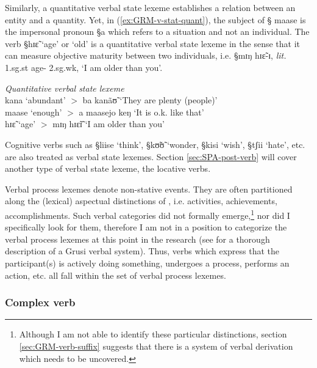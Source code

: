 Similarly, a quantitative verbal state lexeme  establishes a relation between an
entity and a quantity. Yet, in (\ref{ex:GRM-v-stat-quant}), the subject of   {\S
maase} is the impersonal pronoun {\S a} which refers to a situation and not an
individual. The verb {\S hɪɛ̃}  `age' or `old'  is a quantitative verbal state
lexeme in the sense that it can measure objective maturity between
two individuals, i.e. {\S mɪŋ hɪɛ̃-ɪ}, {\it lit.} {\sc 1.sg.st} age-{\sc
2.sg.wk}, `I am older than you'. 


\begin{exe}
\ex\label{ex:GRM-v-stat-quant}{\it Quantitative verbal state lexeme}\\
 {\I kana}  `abundant'  $>$ {\I ba kanãʊ̃} `They are plenty (people)' \\
{\I maase} `enough'  $>$   {\I a maasejo keŋ} `It is o.k. like that'\\
{\I hɪɛ̃} `age' $>$ {\I mɪŋ hɪɛ̃ɪ̃} `I am older than you'
\end{exe}

Cognitive verbs such as {\S liise} `think',  {\S kʊ̃ʊ̃} `wonder, 
{\S kisi} `wish',    {\S tʃii} `hate', etc.  are also treated as verbal state
lexemes. Section \ref{sec:SPA-post-verb} will  cover another
type  of verbal state lexeme,  the locative verbs. 

Verbal process lexemes denote non-stative events. They are often partitioned
along the
(lexical) aspectual distinctions of  \cite{Vend57}, i.e. activities, 
achievements, accomplishments. Such verbal categories did not formally
emerge,\footnote{Although I am not able to identify these particular
distinctions, section \ref{sec:GRM-verb-suffix} suggests that there is a system
of verbal derivation which needs to be uncovered.}
nor did I specifically look for them, therefore I am not in a position to
categorize the verbal process lexemes at this point in the research (see
\citet[51]{Bonv88} for a thorough
description of a Grusi verbal system).   Thus, verbs which express that the
participant(s) is actively doing something, undergoes a process, performs an
action, etc. all fall within the  set of verbal process
lexemes. 



\subsubsection{Complex verb}
\label{sec:GRM-complex-verb}


